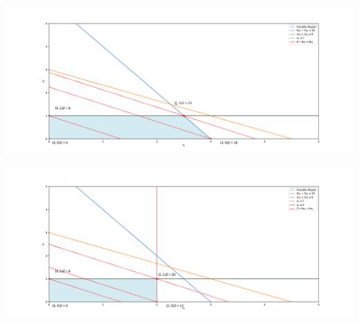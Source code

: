 \begin{center}
    \includegraphics[width = \textwidth]{Exercice/PY/EX1/ex1.2.pdf}
\end{center}


\begin{center}
    \includegraphics[width = \textwidth]{Exercice/PY/EX1/ex1.3.pdf}
\end{center}

